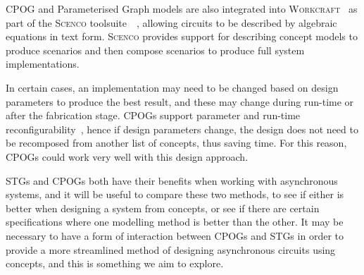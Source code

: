 \documentclass[british,compsoc]{IEEEtran}
\newcommand{\noun}[1]{\textsc{#1}}
\begin{document}
CPOG and Parameterised Graph models are also integrated into
\noun{Workcraft}~\cite{Workcraft_website} as part of the \noun{Scenco} toolsuite~\cite{2015_workcraft_scenco}~\cite{Scenco_paper},
allowing circuits to be described by algebraic equations in text
form. \noun{Scenco} provides support for describing concept models
to produce scenarios and then compose scenarios to produce full system
implementations.


In certain cases, an implementation may need to be changed based on
design parameters to produce the best result, and these may change
during run-time or after the fabrication stage. CPOGs support parameter
and run-time reconfigurability~\cite{microadapt}, hence if
design parameters change, the design does not need to be recomposed
from another list of concepts, thus saving time. For this reason,
CPOGs could work very well with this design approach.

STGs and CPOGs both have their benefits when working with asynchronous
systems, and it will be useful to compare these two methods, to see
if either is better when designing a system from concepts, or see
if there are certain specifications where one modelling method is
better than the other. It may be necessary to have a form of interaction between CPOGs and STGs in order to provide a more streamlined method of designing asynchronous circuits
using concepts, and this is something we aim to explore.


%
%
%
\end{document}
